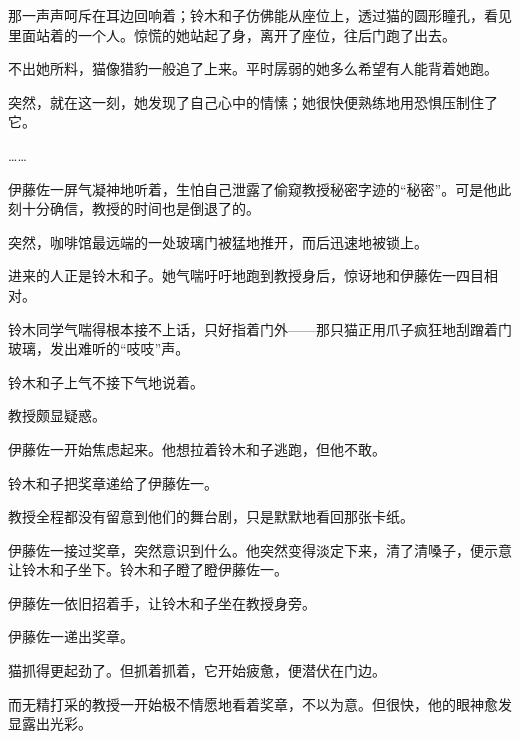 
那一声声呵斥在耳边回响着；铃木和子仿佛能从座位上，透过猫的圆形瞳孔，看见里面站着的一个人。惊慌的她站起了身，离开了座位，往后门跑了出去。

不出她所料，猫像猎豹一般追了上来。平时孱弱的她多么希望有人能背着她跑。


突然，就在这一刻，她发现了自己心中的情愫；她很快便熟练地用恐惧压制住了它。

……


伊藤佐一屏气凝神地听着，生怕自己泄露了偷窥教授秘密字迹的“秘密”。可是他此刻十分确信，教授的时间也是倒退了的。

突然，咖啡馆最远端的一处玻璃门被猛地推开，而后迅速地被锁上。

进来的人正是铃木和子。她气喘吁吁地跑到教授身后，惊讶地和伊藤佐一四目相对。


铃木同学气喘得根本接不上话，只好指着门外——那只猫正用爪子疯狂地刮蹭着门玻璃，发出难听的“吱吱”声。

铃木和子上气不接下气地说着。

教授颇显疑惑。

伊藤佐一开始焦虑起来。他想拉着铃木和子逃跑，但他不敢。


铃木和子把奖章递给了伊藤佐一。

教授全程都没有留意到他们的舞台剧，只是默默地看回那张卡纸。

伊藤佐一接过奖章，突然意识到什么。他突然变得淡定下来，清了清嗓子，便示意让铃木和子坐下。铃木和子瞪了瞪伊藤佐一。

伊藤佐一依旧招着手，让铃木和子坐在教授身旁。

伊藤佐一递出奖章。

猫抓得更起劲了。但抓着抓着，它开始疲惫，便潜伏在门边。

而无精打采的教授一开始极不情愿地看着奖章，不以为意。但很快，他的眼神愈发显露出光彩。


